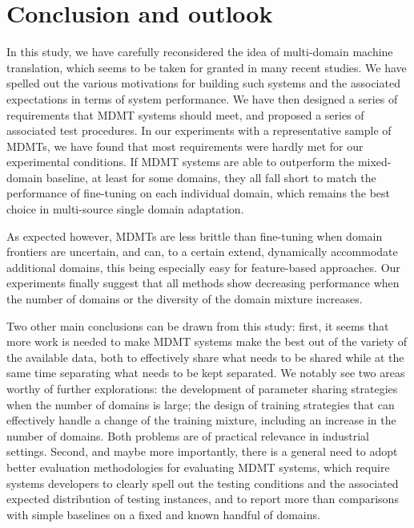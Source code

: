 \section{Conclusion and outlook \label{sec:conclusion}}

In this study, we have carefully reconsidered the idea of multi-domain machine translation, which seems to be taken for granted in many recent studies. We have spelled out the various motivations for building such systems and the associated expectations in terms of system performance. We have then designed a series of requirements that MDMT systems should meet, and proposed a series of associated test procedures. In our experiments with a representative sample of MDMTs, we have found that most requirements were hardly met for our experimental conditions. If MDMT systems are able to outperform the mixed-domain baseline, at least for some domains, they all fall short to match the performance of fine-tuning on each individual domain, which remains the best choice in multi-source single domain adaptation.

As expected however, MDMTs are less brittle than fine-tuning when domain frontiers are uncertain, and can, to a certain extend, dynamically accommodate additional domains, this being especially easy for feature-based approaches. Our experiments finally suggest that all methods show decreasing performance when the number of domains or the diversity of the domain mixture increases. %

Two other main conclusions can be drawn from this study: first, it seems that more work is needed to make MDMT systems make the best out of the variety of the available data, both to effectively share what needs to be shared while at the same time separating what needs to be kept separated. We notably see two areas worthy of further explorations: the development of parameter sharing strategies when the number of domains is large; the design of training strategies that can effectively handle a change of the training mixture, including an increase in the number of domains. Both problems are of practical relevance in industrial settings. Second, and maybe more importantly, there is a general need to adopt better evaluation methodologies for evaluating MDMT systems, which require systems developers to clearly spell out the testing conditions and the associated expected distribution of testing instances, and to report more than comparisons with simple baselines on a fixed and known handful of domains.

